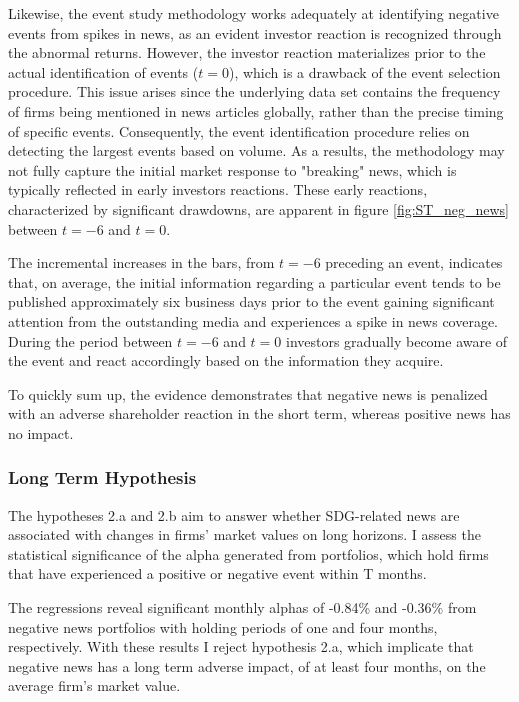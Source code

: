 Likewise, the event study methodology works adequately at identifying negative events from spikes in news, as an evident investor reaction is recognized through the abnormal returns. However, the investor reaction materializes prior to the actual identification of events ($t=0$), which is a drawback of the event selection procedure. This issue arises since the underlying data set contains the frequency of firms being mentioned in news articles globally, rather than the precise timing of specific events. Consequently, the event identification procedure relies on detecting the largest events based on volume. As a results, the methodology may not fully capture the initial market response to "breaking" news, which is typically reflected in early investors reactions. These early reactions, characterized by significant drawdowns, are apparent in figure \ref{fig:ST_neg_news} between $t = -6$ and $t = 0$. 

The incremental increases in the bars, from $t=-6$ preceding an event, indicates that, on average, the initial information regarding a particular event tends to be published approximately six business days prior to the event gaining significant attention from the outstanding media and experiences a spike in news coverage. During the period between $t=-6$ and $t=0$ investors gradually become aware of the event and react accordingly based on the information they acquire. 

To quickly sum up, the evidence demonstrates that negative news is penalized with an adverse shareholder reaction in the short term, whereas positive news has no impact.  


\subsubsection{Long Term Hypothesis} \label{sec: long_term_analysis}

The hypotheses 2.a and 2.b aim to answer whether SDG-related news are associated with changes in firms' market values on long horizons. I assess the statistical significance of the alpha generated from portfolios, which hold firms that have experienced a positive or negative event within T months. 

The regressions reveal significant monthly alphas of -0.84\% and -0.36\% from negative news portfolios with holding periods of one and four months, respectively. With these results I reject hypothesis 2.a, which implicate that negative news has a long term adverse impact, of at least four months, on the average firm's market value. 

